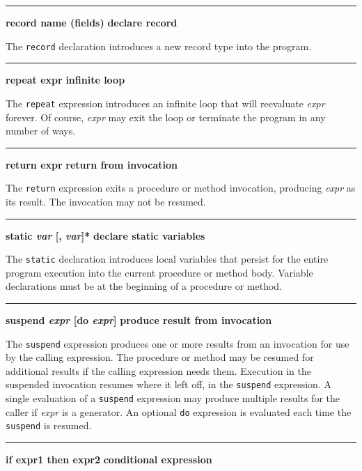 \bigskip\hrule\vspace{0.1cm}
\noindent
{\bf record name (fields) } \hfill {\bf declare record}

\noindent
{}The \texttt{record} declaration introduces a new record
type into the program.

\bigskip\hrule\vspace{0.1cm}
\noindent
{\bf repeat expr } \hfill {\bf infinite loop}

\noindent
{}The \texttt{repeat} expression
introduces an infinite loop that will reevaluate \textit{expr} forever.
Of course, \textit{expr} may exit the loop or terminate the program in
any number of ways.

\bigskip\hrule\vspace{0.1cm}
\noindent
{\bf return expr } \hfill {\bf return from invocation}

\noindent
{}The \texttt{return} expression exits a procedure or method
invocation, producing \textit{expr} as its result. The invocation may
not be resumed.

\bigskip\hrule\vspace{0.1cm}
\noindent
{\bf \textbf{static} \textit{var} [, \textit{var}]* } \hfill {\bf declare static variables}

\noindent
{}The \texttt{static} declaration introduces 
local variables that persist for the entire program execution
into the current procedure or method body. Variable
declarations must be at the beginning of a procedure or method.

\bigskip\hrule\vspace{0.1cm}
\noindent
{\bf \textbf{suspend} \textit{expr} [do \textit{expr}] } \hfill {\bf produce result from invocation}

\noindent
{}The \texttt{suspend} expression produces one or more
results from an invocation for use by the calling expression. The
procedure or method may be resumed for additional results if the
calling expression needs them. Execution in the suspended invocation
resumes where it left off, in the \texttt{suspend} expression. A single
evaluation of a \texttt{suspend} expression may produce multiple
results for the caller if \textit{expr} is a
generator. An optional \texttt{do} expression is
evaluated each time the \texttt{suspend} is resumed.

\bigskip\hrule\vspace{0.1cm}
\noindent
{\bf if expr1 then expr2 } \hfill {\bf conditional expression}

